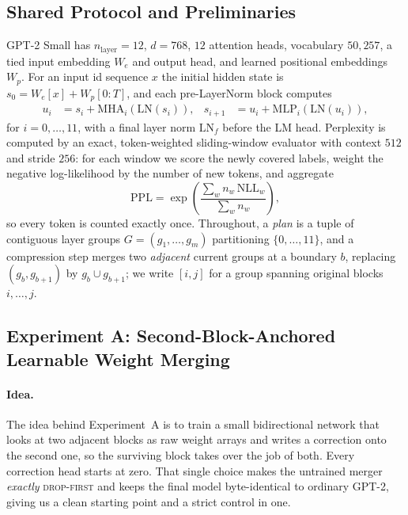 \documentclass[10pt,a4paper]{article}
\newcommand{\dropfirst}{\textsc{drop-first}}
\begin{document}
\subsection{Shared Protocol and Preliminaries}
\label{sec:protocol}

GPT-2 Small has $n_\text{layer}=12$, $d=768$, $12$ attention heads, vocabulary
$50{,}257$, a tied input embedding $W_e$ and output head, and learned positional
embeddings $W_p$. For an input id sequence $x$ the initial hidden state is
$s_0 = W_e[x] + W_p[0{:}T]$, and each pre-LayerNorm block computes
\begin{align}
u_i &= s_i + \mathrm{MHA}_i(\mathrm{LN}(s_i)), &
s_{i+1} &= u_i + \mathrm{MLP}_i(\mathrm{LN}(u_i)),
\end{align}
for $i=0,\dots,11$, with a final layer norm $\mathrm{LN}_f$ before the LM head.
Perplexity is computed by an exact, token-weighted sliding-window evaluator with
context $512$ and stride $256$: for each window we score the newly covered
labels, weight the negative log-likelihood by the number of new tokens, and
aggregate
\begin{equation}
\mathrm{PPL} = \exp\!\left(\frac{\sum_w n_w\,\mathrm{NLL}_w}{\sum_w n_w}\right),
\end{equation}
so every token is counted exactly once. Throughout, a \emph{plan} is a tuple of
contiguous layer groups $G=(g_1,\dots,g_m)$ partitioning $\{0,\dots,11\}$, and a
compression step merges two \emph{adjacent} current groups at a boundary $b$,
replacing $(g_b,g_{b+1})$ by $g_b\cup g_{b+1}$; we write $[i,j]$ for a group
spanning original blocks $i,\dots,j$.

\subsection{Experiment A: Second-Block-Anchored Learnable Weight Merging}
\label{sec:expA}

\paragraph{Idea.} The idea behind Experiment~A is to train a small bidirectional
network that looks at two adjacent blocks as raw weight arrays and writes a
correction onto the second one, so the surviving block takes over the job of
both. Every correction head starts at zero. That single choice makes the
untrained merger \emph{exactly} \dropfirst{} and keeps the final model
byte-identical to ordinary GPT-2, giving us a clean starting point and a strict
control in one.
\end{document}
